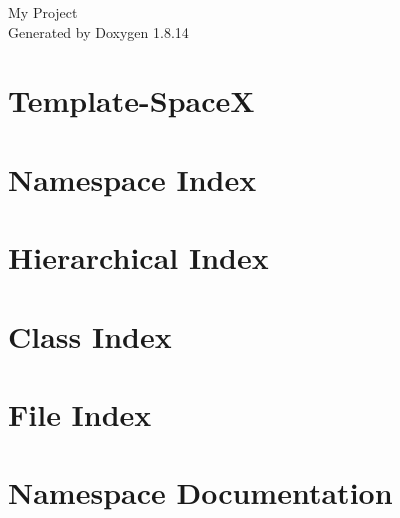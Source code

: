 \documentclass[twoside]{book}
\newcommand{\+}{\discretionary{\mbox{\scriptsize$\hookleftarrow$}}{}{}}
\newcommand{\clearemptydoublepage}{%
  \newpage{\pagestyle{empty}\cleardoublepage}%
}
\begin{document}
\hypersetup{pageanchor=false,
             bookmarksnumbered=true,
             pdfencoding=unicode
            }
\begin{titlepage}
\vspace*{7cm}
\begin{center}%
{\Large My Project }\\
\vspace*{1cm}
{\large Generated by Doxygen 1.8.14}\\
\end{center}
\end{titlepage}
\clearemptydoublepage
{}
\tableofcontents
\clearemptydoublepage
{}
\hypersetup{pageanchor=true}

\chapter{Template-\/\+SpaceX}
\label{md__r_e_a_d_m_e}

\chapter{Namespace Index}

\chapter{Hierarchical Index}

\chapter{Class Index}

\chapter{File Index}

\chapter{Namespace Documentation}







\end{document}
